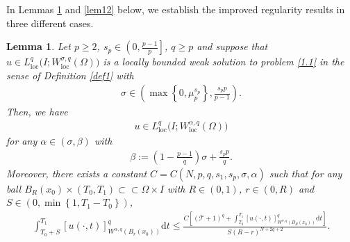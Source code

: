 \documentclass[reqno,10pt]{amsart}
\numberwithin{equation}{section}
\newtheorem{lemma}[theorem]{Lemma}
\begin{document}
In Lemmas \ref{lem6} and \ref{lem12} below, we establish the improved regularity results in three different cases.

\begin{lemma}
	\label{lem6}
	Let $p\ge2$, $s_p\in \left( 0,\frac{p-1}{p}\right] $, $q\ge p$ and suppose that $u\in L^q_{\mathrm{loc}}\bigl(I;W^{\sigma,q}_{\mathrm{loc}}(\Omega)\bigl) $ is a locally bounded weak solution to problem \eqref{1.1} in the sense of Definition \ref{def1} with
	\begin{align*}
		\sigma\in\left(\max\left\lbrace0,\mu^{s_p}_p\right\rbrace,\frac{s_pp}{p-1}\right). 
	\end{align*}
	Then, we have
	\begin{align*}
		u\in L^q_{\mathrm{loc}}\bigl(I;W^{\alpha,q}_{\mathrm{loc}}(\Omega)\bigl) 
	\end{align*}
	for any $\alpha\in(\sigma,\beta)$ with
	\begin{align*}
		\beta:=\left( 1-\frac{p-1}{q}\right)\sigma+\frac{s_pp}{q}. 
	\end{align*}
	Moreover, there exists a constant $C=C(N,p,q,s_1,s_p,\sigma,\alpha)$ such that for any ball $B_R(x_0)\times(T_0,T_1)\subset\subset\Omega\times I$ with $R\in(0,1)$, $r\in(0,R)$ and $S\in (0,\min\left\lbrace 1,T_1-T_0\right\rbrace )$,
	\begin{align*}
		\int_{T_0+S}^{T_1}[u(\cdot,t)]^q_{W^{\alpha,q}\left( B_r(x_0)\right)}\mathrm{d}t\le\frac{C\left[\left(\mathcal{T}+1\right)^q+\int_{T_0}^{T_1}[u(\cdot,t)]^q_{W^{\sigma,q}\left( B_R(x_0)\right)}\mathrm{d}t\right]}{S(R-r)^{N+2q+2}}.
	\end{align*}
\end{lemma}
\end{document}
